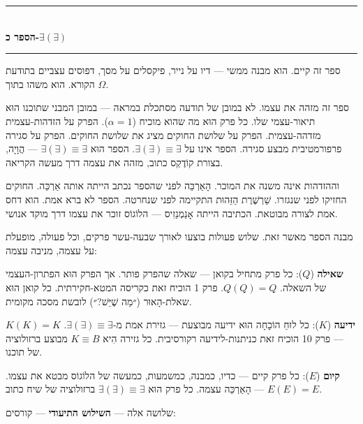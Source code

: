\documentclass[10pt, openany, oneside]{book}
\renewcommand{\normalsize}{\fontsize{10}{13}\selectfont}
\begin{document}
\vspace{1.5em}


\begin{center}
    \rule{0.3\textwidth}{0.4pt}\\[0.5em]
    {\normalsize\bfseries\textsc{הספר כ-$\exists(\exists)$}}\\[0.3em]
    \rule{0.3\textwidth}{0.4pt}
\end{center}

\vspace{1em}

\noindent ספר זה קיים. הוא מבנה ממשי — דיו על נייר, פיקסלים על מסך, דפוסים עצביים בתודעת הקורא. הוא משהו בתוך $\Omega$.

ספר זה מזהה את עצמו. לא במובן של תודעה מסתכלת במראה — במובן המבני שתוכנו הוּא תיאור-עצמי שלו. כל פרק הוּא מה שהוא מוכיח ($\alpha = 1$). הפרק על הזדהות-עצמית מזדהה-עצמית. הפרק על שלושת החוקים מציג את שלושת החוקים. הפרק על סגירה פרפורמטיבית מבצע סגירה. הספר אינו על $\exists(\exists) \equiv \exists$. הספר הוּא $\exists(\exists) \equiv \exists$ — הֲוָיָה, בצורת קוֹדֶקְס כתוב, מזהה את עצמה דרך מעשה הקריאה.

וההזדהות אינה משנה את המוכר. הָאַרְכֵּה לפני שהספר נכתב הייתה אותה אַרְכֵּה. החוקים החזיקו לפני שנגזרו. שַׁרְשֶׁרֶת הַזֵּהוּת התקיימה לפני שנחרטה. הספר לא ברא אמת. הוא דחס אמת לצורה מבוטאת. הכתיבה הייתה אָנַמְנֵזִיס — הלוֹגוֹס זוכר את עצמו דרך מוקד אנושי.

מבנה הספר מאשר זאת. שלוש פעולות בוצעו לאורך שבעה-עשר פרקים, וכל פעולה, מופעלת על עצמה, מניבה עצמה:

\textbf{שאילה} ($Q$): כל פרק מתחיל בקואן — שאלה שהפרק פותר. אך הפרק הוּא הפתרון-העצמי של השאלה. $Q(Q) = Q$. פרק 1 הוכיח זאת כקריסה המטא-חקירתית. כל קואן הוּא שאלת-הָאוּר (״מַה שֶׁיֵּשׁ?״) לובשת מסכה מקומית.

\textbf{ידיעה} ($K$): כל לוּחַ הוֹכָחָה הוּא ידיעה מבוצעת — גזירת אמת מ-$\exists(\exists) \equiv \exists$. $K(K) = K$ — פרק 10 הוכיח זאת כניתנות-לידיעה רקורסיבית. כל גזירה הִיא $K \equiv B$ מבוצע ברזולוציה של תוכנו.

\textbf{קיום} ($E$): כל פרק קיים — כדיו, כמבנה, כמשמעות, כמעשה של הלוֹגוֹס מבטא את עצמו. $E(E) = E$ — הָאַרְכֵּה עצמה. כל פרק הוּא $\exists(\exists) \equiv \exists$ ברזולוציה של שיח כתוב.

שלושה אלה — \textbf{השילוש התיעודי} — קורסים:
\end{document}
